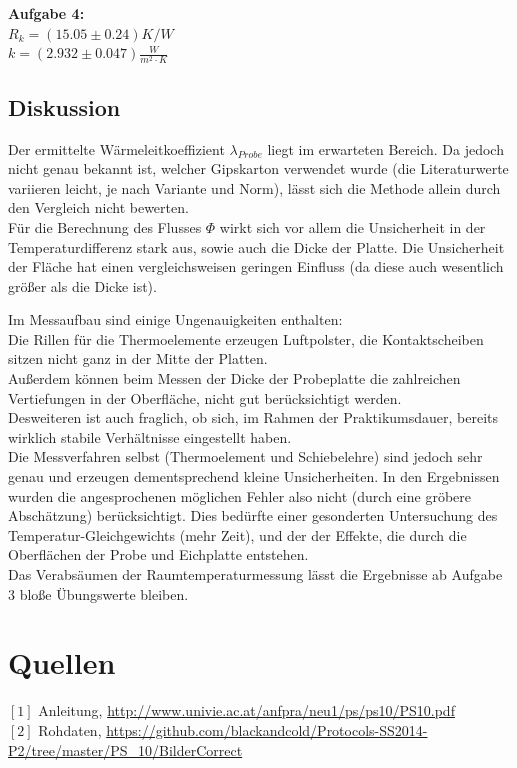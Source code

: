 \documentclass[12pt,a4paper]{article}
\begin{document}
\begin{multicols}{2}
\noindent \textbf{Aufgabe 4:}\\
$R_k=(15.05\pm 0.24)K/W$\\
$k=(2.932 \pm 0.047)\frac{W}{m^2 \cdot K}$


\subsection{Diskussion}
Der ermittelte Wärmeleitkoeffizient $\lambda_{Probe}$ liegt im erwarteten Bereich. Da jedoch nicht genau bekannt ist, welcher Gipskarton verwendet wurde (die Literaturwerte variieren leicht, je nach Variante und Norm), lässt sich die Methode allein durch den Vergleich nicht bewerten.\\
Für die Berechnung des Flusses $\Phi$ wirkt sich vor allem die Unsicherheit in der Temperaturdifferenz stark aus, sowie auch die Dicke der Platte. Die Unsicherheit der Fläche hat einen vergleichsweisen geringen Einfluss (da diese auch wesentlich größer als die Dicke ist).

Im Messaufbau sind einige Ungenauigkeiten enthalten:\\
Die Rillen für die Thermoelemente erzeugen Luftpolster, die Kontaktscheiben sitzen nicht ganz in der Mitte der Platten.\\
Außerdem können beim Messen der Dicke der Probeplatte die zahlreichen Vertiefungen in der Oberfläche, nicht gut berücksichtigt werden.\\
Desweiteren ist auch fraglich, ob sich, im Rahmen der Praktikumsdauer, bereits wirklich stabile Verhältnisse eingestellt haben.\\
Die Messverfahren selbst (Thermoelement und Schiebelehre) sind jedoch sehr genau und erzeugen dementsprechend kleine Unsicherheiten. In den Ergebnissen wurden die angesprochenen möglichen Fehler also nicht (durch eine gröbere Abschätzung) berücksichtigt. Dies bedürfte einer gesonderten Untersuchung des Temperatur-Gleichgewichts (mehr Zeit), und der der Effekte, die durch die Oberflächen der Probe und Eichplatte entstehen.\\

Das Verabsäumen der Raumtemperaturmessung lässt die Ergebnisse ab Aufgabe 3 bloße Übungswerte bleiben.\\




\section{Quellen}
$[1]$ Anleitung, \url{http://www.univie.ac.at/anfpra/neu1/ps/ps10/PS10.pdf}\\
$[2]$ Rohdaten, \url{https://github.com/blackandcold/Protocols-SS2014-P2/tree/master/PS_10/BilderCorrect}\\

\end{multicols}
\end{document}
